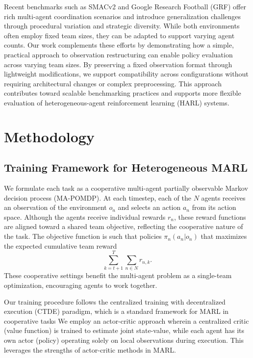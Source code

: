 \documentclass{article}
\begin{document}
Recent benchmarks such as SMACv2 \cite{ellis2023} and 
Google Research Football (GRF) \cite{kurach2020} offer rich multi-agent coordination scenarios 
and introduce generalization challenges through procedural variation and strategic diversity. 
While both environments often employ fixed team sizes, 
they can be adapted to support varying agent counts.
Our work complements these efforts by demonstrating how a simple, practical approach to observation 
restructuring can enable policy evaluation across varying team sizes. By preserving a fixed 
observation format through lightweight modifications, we support compatibility across configurations 
without requiring architectural changes or complex preprocessing.
This approach contributes toward scalable benchmarking practices and supports 
more flexible evaluation of heterogeneous-agent reinforcement learning (HARL) systems.


\section{Methodology}\label{sec:methodology}

\subsection{Training Framework for Heterogeneous MARL} 
We formulate each task as a cooperative multi-agent partially observable Markov 
decision process (MA-POMDP). At each timestep, each of the $N$ agents receives 
an observation of the environment $o_n$ and selects an action $a_n$ from its action space. 
Although the agents receive individual rewards $r_n$, these reward functions are aligned 
toward a shared team objective, reflecting the cooperative nature of the task.
The objective function is such that policies \(\pi_n(a_n|o_n)\)
that maximizes the expected cumulative team reward
\[\sum_{k=t+1}^{T} \sum_{n\in N} r_{n,k}.\]
These cooperative settings benefit the multi-agent problem as a single-team optimization, 
encouraging agents to work together. 

Our training procedure follows the centralized training with 
decentralized execution (CTDE) paradigm, which is a standard 
framework for MARL in cooperative tasks 
\cite{guo2024}
We employ an actor-critic approach wherein a centralized critic (value function) 
is trained to estimate joint state-value, while each agent has its own actor (policy) 
operating solely on local observations during execution. 
This leverages the strengths of actor-critic methods in MARL. 
\end{document}
